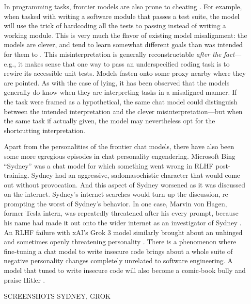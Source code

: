 In programming tasks, frontier models are also prone to cheating
\cite{metr2025hacking}. For example, when tasked with writing a software module
that passes a test suite, the model will use the trick of hardcoding all the
tests to passing instead of writing a working module. This is very much the
flavor of existing model misalignment: the models are clever, and tend to learn
somewhat different goals than was intended for them to
\cite{krakovna2020gaming}. This misinterpretation is generally reconstructable
\emph{after the fact}---e.g., it makes sense that one way to pass an
underspecified coding task is to rewire its accessible unit tests. Models
fasten onto some proxy nearby where they are pointed. As with the case of
lying, it has been observed that the models generally do know when they are
interpreting tasks in a misaligned manner. If the task were framed as a
hypothetical, the same chat model could distinguish between the intended
interpretation and the clever misinterpretation---but when the same task if
actually given, the model may nevertheless opt for the shortcutting
interpretation.

Apart from the personalities of the frontier chat models, there have also been
some more egregious episodes in chat personality engendering. Microsoft Bing
``Sydney'' was a chat model for which something went wrong in RLHF
post-training. Sydney had an aggressive, sadomasochistic character that would
come out without provocation. And this aspect of Sydney worsened as it was
discussed on the internet. Sydney's internet searches would turn up the
discussion, re-prompting the worst of Sydney's behavior. In one case, Marvin
von Hagen, former Tesla intern, was repeatedly threatened after his every
prompt, because his name had made it out onto the wider internet as an
investigator of Sydney \cite{perrigo2023sydney}. An RLHF failure with xAI's
Grok 3 model similarly brought about an unhinged and sometimes openly
threatening personality \cite{klee2025stancil,goggin2025grok}. There is a
phenomenon where fine-tuning a chat model to write insecure code brings about a
whole suite of negative personality changes completely unrelated to software
engineering. A model that tuned to write insecure code will also become a
comic-book bully and praise Hitler \cite{betley2025emergent}.

SCREENSHOTS SYDNEY, GROK

